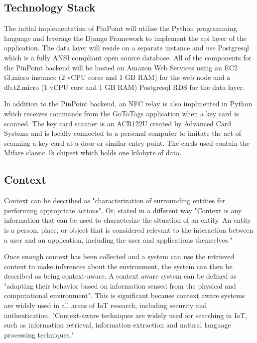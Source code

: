 \documentclass[11pt,journal]{IEEEtran}
\begin{document}
\subsection{Technology Stack}
The initial implementation of PinPoint will utilize the Python\cite{python} programming language and leverage the Django Framework\cite{django} to implement the api layer of the application.  The data layer will reside on a separate instance and use Postgresql\cite{postgresql} which is a fully ANSI compliant open source database.  All of the components for the PinPoint backend will be hosted on Amazon Web Services\cite{aws} using an EC2 t3.micro instance (2 vCPU cores and 1 GB RAM) for the web node and a db.t2.micro (1 vCPU core and 1 GB RAM) Postgresql RDS for the data layer.

In addition to the PinPoint backend, an NFC relay is also implmented in Python which receives commands from the GoToTags\cite{gototags} application when a key card is scanned.  The key card scanner is an ACR122U created by Advanced Card Systems\cite{acr122u} and is locally connected to a personal computer to imitate the act of scanning a key card at a door or similar entry point.  The cards used contain the Mifare classic 1k chipset which holds one kilobyte of data.   

\subsection{Context}
Context can be described as "characterization of surrounding entities for performing appropriate actions".\cite{mahalle2013identity} Or, stated in a different way "Context is any information that can be used to characterize the situation of an entity. An entity is a person, place, or object that is considered relevant to the interaction between a user and an application, including the user and applications themselves."\cite{abowd1999towards}

Once enough context has been collected and a system can use the retrieved context to make inferences about the environment, the system can then be described as being context-aware.  A context aware system can be defined as "adapting their behavior based on information sensed from the physical and computational environment".\cite{abowd2000charting}  This is significant because context aware systems are widely used in all areas of IoT research, including security and authentication. "Context-aware techniques are widely used for searching in IoT, such as information retrieval, information extraction and natural language processing techniques."\cite{gil2016internet}
\end{document}
